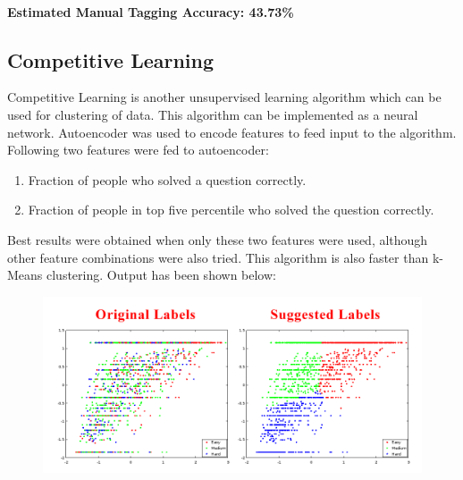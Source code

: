 \documentclass[12pt]{article}
\begin{document}
	\paragraph{Estimated Manual Tagging Accuracy: 43.73\%}
	
	
	\newpage
	\subsection{Competitive Learning}
	Competitive Learning is another unsupervised learning algorithm which can
	be used for	clustering of data. This algorithm can be implemented as
	a neural network. Autoencoder was used to encode features to feed input
	to the algorithm. Following two features were fed to autoencoder:
	\begin{enumerate}
	\item Fraction of people who solved a question correctly.
	\item Fraction of people in top five percentile who solved the question
	correctly.
	\end{enumerate}
	
	Best results were obtained when only these two features were used, 
	although other feature combinations were also tried. This algorithm
	is also faster than k-Means	clustering. Output has been shown below:
	\begin{figure}[h]
	\includegraphics[width=\textwidth]{CompetitiveOutput}
	\end{figure}
	
\end{document}
